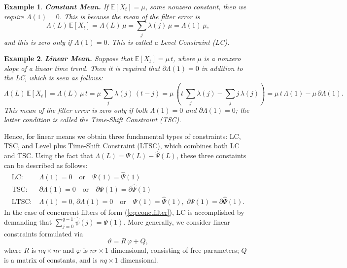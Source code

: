 \documentclass[a4paper]{book}
\def\EE{\mathbb E}
\newtheorem{Example}{Example}
\begin{document}
\begin{Example}    {\bf Constant Mean.}  \rm
\label{exam:constant.mean}
  If $\EE [ X_t ] = \mu$, some nonzero constant,  then we require $\Lambda (1) = 0$.
  This is because the mean of the filter error is
  \[
   \Lambda (L) \, \EE [ X_t] = \Lambda(L) \, \mu = \sum_j \lambda (j) \, \mu =
   \Lambda (1) \, \mu,
  \]
  and this is zero only if $\Lambda (1) = 0$.  This is called a Level Constraint (LC).
\end{Example}  

\begin{Example}    {\bf Linear Mean.}  \rm
\label{exam:linear.mean}
  Suppose that $\EE [ X_t ] = \mu \, t$, where $\mu$ is a nonzero slope
 of a linear time trend.  Then it is required that  $\partial {\Lambda} (1) = 0$
  in addition to the LC,  which is seen as follows:
  \[
   \Lambda (L) \, \EE [ X_t] = \Lambda(L) \, \mu \, t =   \mu \, \sum_j \lambda (j) \, (t-j)
   = \mu \, \left(t \, \sum_j \lambda (j) - \sum_j j \, \lambda (j) \right)
    = \mu \, t \, \Lambda(1) - \mu \, \partial \Lambda (1).
  \]
  This mean of the filter error  is zero only if both $\Lambda(1)=0$ and
  $\partial \Lambda (1)=0$; the latter condition is called the
   Time-Shift Constraint (TSC).  
\end{Example}  

     Hence, for linear means we obtain
 three fundamental types of constraints: LC, TSC, and Level plus 
 Time-Shift Constraint (LTSC), which combines both LC and TSC.
  Using the fact that $\Lambda (L) = \Psi (L) - \widehat{\Psi} (L)$,
   these three constaints can be described as follows:
\begin{align*}
 \mbox{LC} : &  \;  \Lambda (1) = 0 \quad \mbox{or} \quad \Psi (1) = \widehat{\Psi} (1) \\
 \mbox{TSC} : &  \;   \partial {\Lambda} (1) = 0 \quad \mbox{or} \quad 
 \partial {\Psi} (1) = \partial {\widehat{\Psi}} (1)  \\
 \mbox{LTSC} : &  \;  \Lambda (1) = 0,  \,  \partial {\Lambda} (1) = 0 \quad 
 \mbox{or} \quad \Psi (1) = \widehat{\Psi} (1), \; \partial {\Psi} (1) =
 \partial {\widehat{\Psi}} (1).
\end{align*}
 In the case of  concurrent filters of form  (\ref{eq:conc.filter}), 
 LC is accomplished by demanding that 
  $\sum_{j=0}^{q-1} \widehat{\psi} (j) = \Psi(1)$.   More generally, we consider  linear constraints  formulated via
\begin{equation}
\label{eq:concurrent-constrain}
  \vartheta = R \, \varphi + Q,
\end{equation}
 where $R$ is $n q \times n r$ and $\varphi$ is $n r \times 1$ dimensional, consisting of 
 free parameters; $Q$ is a matrix of constants, and is $n q \times 1$ dimensional.
\end{document}
